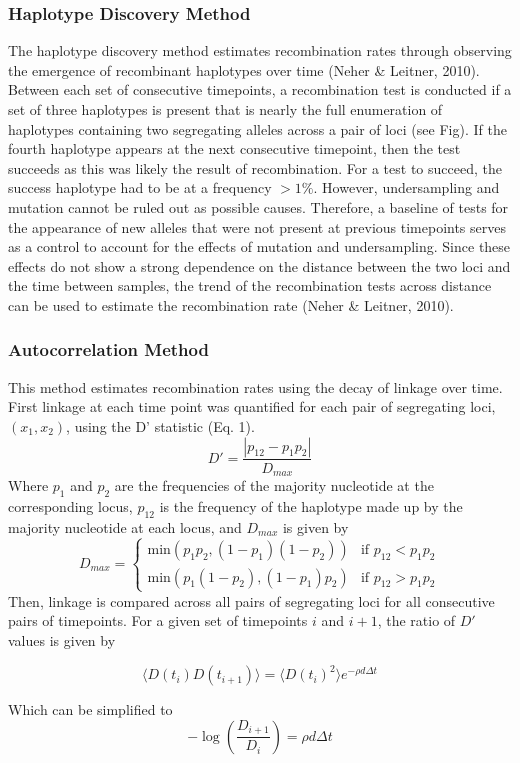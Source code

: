 \documentclass[12pt]{article}
\begin{document}
\subsubsection*{Haplotype Discovery Method}
The haplotype discovery method estimates recombination rates through observing the emergence of recombinant haplotypes over time (Neher \& Leitner, 2010). Between each set of consecutive timepoints, a recombination test is conducted if a set of three haplotypes is present that is nearly the full enumeration of haplotypes containing two segregating alleles across a pair of loci (see Fig). If the fourth haplotype appears at the next consecutive timepoint, then the test succeeds as this was likely the result of recombination. For a test to succeed, the success haplotype had to be at a frequency $>1\%$.  However, undersampling and mutation cannot be ruled out as possible causes. Therefore, a baseline of tests for the appearance of new alleles that were not present at previous timepoints serves as a control to account for the effects of mutation and undersampling. Since these effects do not show a strong dependence on the distance between the two loci and the time between samples, the trend of the recombination tests across distance can be used to estimate the recombination rate (Neher \& Leitner, 2010).
\newpage
\subsubsection*{Autocorrelation Method}

    This method estimates recombination rates using the decay of linkage over time. First linkage at each time point was quantified for each pair of segregating loci, $(x_1, x_2)$, using the D’ statistic (Eq. 1). 
 \begin{equation}
 D' = \frac{|p_{12} - p_1p_2|}{D_{max}}
 \end{equation}
     Where $p_1$ and $p_2$ are the frequencies of the majority nucleotide at the corresponding locus, $p_{12}$ is the frequency of the haplotype made up by the majority nucleotide at each locus, and $D_{max}$ is given by
\[
    D_{max} = \begin{cases}
    \text{min}(p_1p_2, (1-p_1)(1-p_2)) & \text{if }p_{12} < p_1p_2\\
    \text{min}(p_1(1-p_2), (1-p_1)p_2) & \text{if }p_{12} > p_1p_2
    \end{cases}
\]
Then, linkage is compared across all pairs of segregating loci for all consecutive pairs of timepoints. For a given set of timepoints $i$ and $i+1$, the ratio of $D'$ values is given by

\[ \langle D(t_i)D(t_{i+1}) \rangle = \langle D(t_i)^2 \rangle e^{-\rho d \Delta t}\]

Which can be simplified to
\begin{equation}
-\log \left(\frac{D_{i+1}}{D_i}\right) = \rho d \Delta t
\end{equation}
\end{document}
